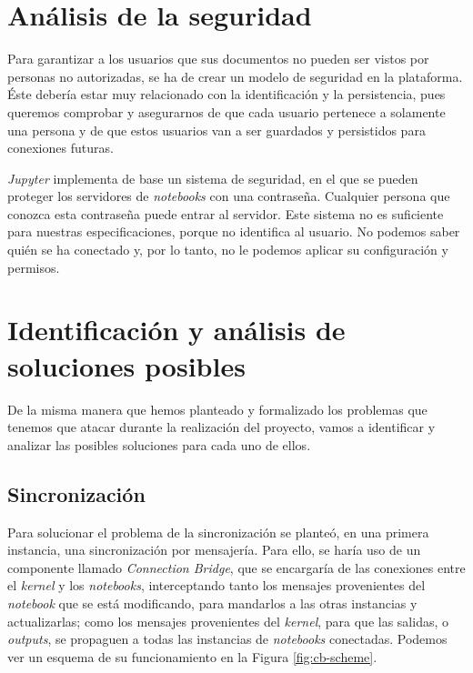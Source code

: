 \documentclass[11pt,spanish,listoffigures,listoftables]{tfgetsinf}
\begin{document}

\section{Análisis de la seguridad}
\label{sec:analisis-seguridad}

Para garantizar a los usuarios que sus documentos no pueden ser vistos por personas no autorizadas, se ha de crear un modelo de seguridad en la plataforma. Éste debería estar muy relacionado con la identificación y la persistencia, pues queremos comprobar y asegurarnos de que cada usuario pertenece a solamente una persona y de que estos usuarios van a ser guardados y persistidos para conexiones futuras.

\textit{Jupyter} implementa de base un sistema de seguridad, en el que se pueden proteger los servidores de \textit{notebooks} con una contraseña. Cualquier persona que conozca esta contraseña puede entrar al servidor. Este sistema no es suficiente para nuestras especificaciones, porque no identifica al usuario. No podemos saber quién se ha conectado y, por lo tanto, no le podemos aplicar su configuración y permisos.



\section{Identificación y análisis de soluciones posibles}
\label{sec:ident-soluciones}

De la misma manera que hemos planteado y formalizado los problemas que tenemos que atacar durante la realización del proyecto, vamos a identificar y analizar las posibles soluciones para cada uno de ellos. 


\subsection{Sincronización}
\label{subsec:sincro}

Para solucionar el problema de la sincronización se planteó, en una primera instancia, una sincronización por mensajería. Para ello, se haría uso de un componente llamado \textit{Connection Bridge}, que se encargaría de las conexiones entre el \textit{kernel} y los \textit{notebooks}, interceptando tanto los mensajes provenientes del \textit{notebook} que se está modificando, para mandarlos a las otras instancias y actualizarlas; como los mensajes provenientes del \textit{kernel}, para que las salidas, o \textit{outputs}, se propaguen a todas las instancias de \textit{notebooks} conectadas. Podemos ver un esquema de su funcionamiento en la Figura \ref{fig:cb-scheme}.
\end{document}

